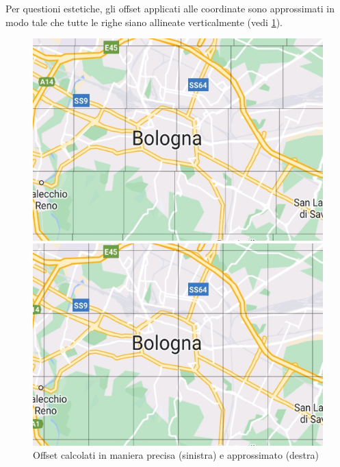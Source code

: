 \documentclass[11pt]{article}
\begin{document}
Per questioni estetiche, gli offset applicati alle coordinate sono approssimati in modo tale che tutte le righe siano allineate verticalmente (vedi \cref{fig:tile_offset}).
\begin{figure}[h]
    \centering
    \begin{minipage}[b]{0.45\textwidth}
      \includegraphics[width=\textwidth]{./img/tile_no_approx.jpg}
    \end{minipage}
    \hfill
    \begin{minipage}[b]{0.45\textwidth}
      \includegraphics[width=\textwidth]{./img/tile_approx.jpg}
    \end{minipage}
    \caption{Offset calcolati in maniera precisa (sinistra) e approssimato (destra)} \label{fig:tile_offset}
\end{figure}
\end{document}
